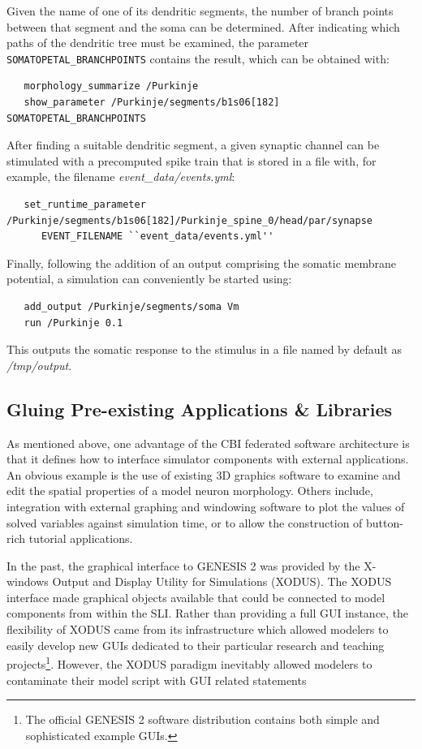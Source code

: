 \documentclass[12pt]{article}
\begin{document}
Given the name of one of its dendritic segments, the number of branch
points between that segment and the soma can be determined. After
indicating which paths of the dendritic tree must be examined, the
parameter {\tt SOMATOPETAL\_BRANCHPOINTS} contains the result, which
can be obtained with:

{\footnotesize
\begin{verbatim}
   morphology_summarize /Purkinje
   show_parameter /Purkinje/segments/b1s06[182] SOMATOPETAL_BRANCHPOINTS
\end{verbatim}
}

After finding a suitable dendritic segment, a given synaptic channel can
be stimulated with a precomputed spike train that is stored in a file
with, for example, the filename {\it event\_data/events.yml}:

{\footnotesize
\begin{verbatim}
   set_runtime_parameter /Purkinje/segments/b1s06[182]/Purkinje_spine_0/head/par/synapse
      EVENT_FILENAME ``event_data/events.yml''
\end{verbatim}
}

Finally, following the addition of an output comprising the somatic membrane potential, a simulation can conveniently be started using:

{\footnotesize
\begin{verbatim}
   add_output /Purkinje/segments/soma Vm
   run /Purkinje 0.1
\end{verbatim}
}

This outputs the somatic response to the stimulus in a file named by default as {\it /tmp/output}.


\subsection{Gluing Pre-existing Applications \& Libraries}

As mentioned above, one advantage of the CBI federated software
architecture is that it defines how to interface simulator components
with external applications.  An obvious example is the use of existing
3D graphics software to examine and edit the spatial properties of a
model neuron morphology.  Others include, integration with external
graphing and windowing software to plot the values of solved
variables against simulation time, or to allow the construction of
button-rich tutorial applications.

In the past, the graphical interface to GENESIS 2 was provided by the
X-windows Output and Display Utility for Simulations (XODUS).  The
XODUS interface made graphical objects available that could be
connected to model components from within the SLI.  Rather than
providing a full GUI instance, the flexibility of XODUS came from its
infrastructure which allowed modelers to easily develop new GUIs
dedicated to their particular research and teaching projects\footnote{The
  official GENESIS 2 software distribution contains both simple and
  sophisticated example GUIs.}.  However, the XODUS paradigm inevitably
allowed modelers to contaminate their model script with GUI related
statements
\end{document}
